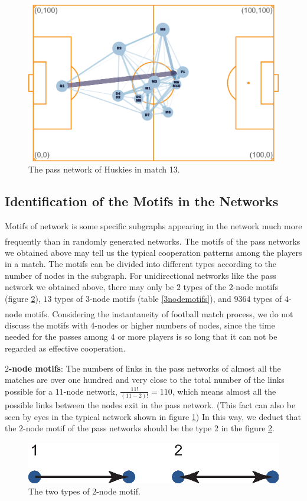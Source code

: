 \documentclass[12pt]{article}
\newcommand{\upcite}[1]{\textsuperscript{\textsuperscript{\cite{#1}}}}
\begin{document}
\begin{figure}[h]
	\centering
	\includegraphics[width=.8\textwidth]{Network13Huskies.eps}
	\caption{The pass network of Huskies in match 13.}
	\label{Network13Huskies}
\end{figure}

\subsection{Identification of the Motifs in the Networks}
Motifs of network is some specific subgraphs appearing in the network much more frequently than in randomly generated networks\upcite{itzkovitz2005subgraphs}. The motifs of the pass networks we obtained above may tell us the typical cooperation patterns among the players in a match. The motifs can be divided into different types according to the number of nodes in the subgraph. For unidirectional networks like the pass network we obtained above, there may only be $2$ types of the $2$-node motifs (figure \ref{2nodemotifs}), $13$ types of 3-node motifs (table \ref{3nodemotifs}), and $9364$ types of $4$-node motifs\upcite{gursakal2018network}. Considering the instantaneity of football match process, we do not discuss the motifs with 4-nodes or higher numbers of nodes, since the time needed for the passes among $4$ or more players is so long that it can not be regarded as effective cooperation.

\textbf{$2$-node motifs}: The numbers of links in the pass networks of almost all the matches are over one hundred and very close to the total number of the links possible for a $11$-node network, $\frac{11!}{(11-2)!}=110$, which means almost all the possible links between the nodes exit in the pass network. (This fact can also be seen by eyes in the typical network shown in figure \ref{Network13Huskies}) In this way, we deduct that the $2$-node motif of the pass networks should be the type 2 in the figure \ref{2nodemotifs}.
\begin{figure}[h]
	\centering
	\includegraphics[width=.4\textwidth]{2NodeMotifs.eps}
	\caption{The two types of $2$-node motif.}
	\label{2nodemotifs}
\end{figure}
\end{document}
